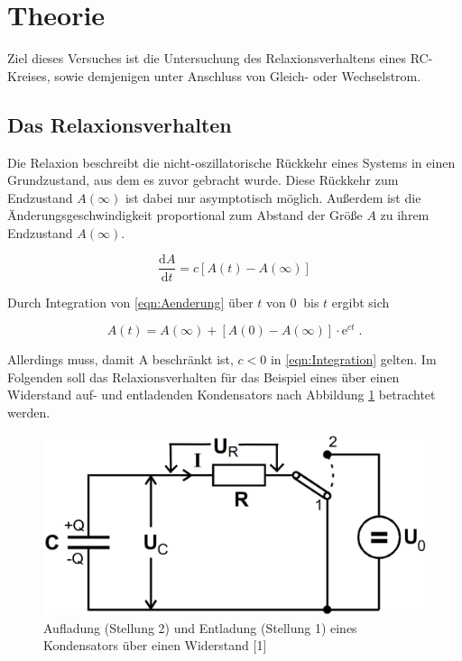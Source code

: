 \section{Theorie}
\label{sec:Theorie}

Ziel dieses Versuches ist die Untersuchung des Relaxionsverhaltens eines RC-Kreises,
sowie demjenigen unter Anschluss von Gleich- oder Wechselstrom. \\

\subsection{Das Relaxionsverhalten}

Die Relaxion beschreibt die nicht-oszillatorische Rückkehr eines Systems in einen
Grundzustand, aus dem es zuvor gebracht wurde. Diese Rückkehr zum Endzustand $A(\infty)$
ist dabei nur asymptotisch möglich. Außerdem ist die Änderungsgeschwindigkeit proportional
zum Abstand der Größe $A$ zu ihrem Endzustand $A(\infty)$.

\begin{equation}
    \frac{\text{d}A}{\text{d}t} = c \left[A(t) - A(\infty) \right]
    \label{eqn:Aenderung}
\end{equation}

Durch Integration von \eqref{eqn:Aenderung} über $t$ von $\SI{0}{}$ bis $t$ ergibt
sich

\begin{equation}
    A(t) = A(\infty) + \left[A(0) - A(\infty) \right] \cdot \text{e}^{ct} \; \text{.}
    \label{eqn:Integration}
\end{equation}

Allerdings muss, damit A beschränkt ist, $c < 0$ in \eqref{eqn:Integration} gelten.
Im Folgenden soll das Relaxionsverhalten für das Beispiel eines über einen Widerstand
auf- und entladenden Kondensators nach Abbildung \ref{fig:sch_auf_ent} betrachtet werden.

\begin{figure}
\centering
\includegraphics[scale=0.2]{content/Schaltung-auf-ent.png}
\caption{Aufladung (Stellung 2) und Entladung (Stellung 1) eines Kondensators über einen Widerstand [1]}
\label{fig:sch_auf_ent}
\end{figure}

